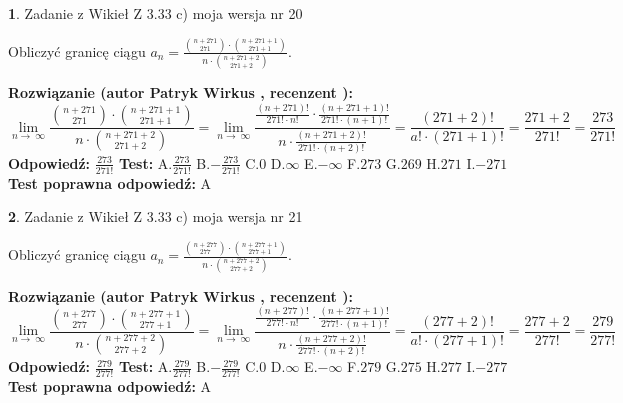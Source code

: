 \documentclass[12pt, a4paper]{article}
\theoremstyle{definition} %
\newtheorem{zad}{}
\newcommand{\zadStart}[1]{\begin{zad}#1\newline}
\newcommand{\zadStop}{\end{zad}}
\newcommand{\rozwStart}[2]{\noindent \textbf{Rozwiązanie (autor #1 , recenzent #2): }\newline}
\newcommand{\rozwStop}{\newline}
\newcommand{\odpStart}{\noindent \textbf{Odpowiedź:}\newline}
\newcommand{\odpStop}{\newline}
\newcommand{\testStart}{\noindent \textbf{Test:}\newline}
\newcommand{\testStop}{\newline}
\newcommand{\kluczStart}{\noindent \textbf{Test poprawna odpowiedź:}\newline}
\newcommand{\kluczStop}{\newline}
\begin{document}
\zadStart{Zadanie z Wikieł Z 3.33 c) moja wersja nr 20}

Obliczyć granicę ciągu $a_{n}=\frac{{n+271\choose271}\cdot{n+271+1\choose271+1}}{n\cdot{n+271+2\choose271+2}}$.
\zadStop
\rozwStart{Patryk Wirkus}{}
$$\lim\limits_{n\to\ \infty}\frac{{n+271\choose271}\cdot{n+271+1\choose271+1}}{n\cdot{n+271+2\choose271+2}} = \lim\limits_{n\to\ \infty}\frac{\frac{(n+271)!}{271! \cdot n!}\cdot \frac{(n+271+1)!}{271! \cdot (n+1)!}}{n\cdot \frac{(n+271+2)!}{271! \cdot (n+2)!}} = \frac{(271+2)!}{a!\cdot (271+1)!} = \frac{271+2}{271!} = \frac{273}{271!}$$
\rozwStop
\odpStart
$\frac{273}{271!}$
\odpStop
\testStart
A.$\frac{273}{271!}$ B.$-\frac{273}{271!}$ C.$0$ D.$\infty$ E.$-\infty$
F.$273$ G.$269$
H.$271$
I.$-271$
\testStop
\kluczStart
A
\kluczStop



\zadStart{Zadanie z Wikieł Z 3.33 c) moja wersja nr 21}

Obliczyć granicę ciągu $a_{n}=\frac{{n+277\choose277}\cdot{n+277+1\choose277+1}}{n\cdot{n+277+2\choose277+2}}$.
\zadStop
\rozwStart{Patryk Wirkus}{}
$$\lim\limits_{n\to\ \infty}\frac{{n+277\choose277}\cdot{n+277+1\choose277+1}}{n\cdot{n+277+2\choose277+2}} = \lim\limits_{n\to\ \infty}\frac{\frac{(n+277)!}{277! \cdot n!}\cdot \frac{(n+277+1)!}{277! \cdot (n+1)!}}{n\cdot \frac{(n+277+2)!}{277! \cdot (n+2)!}} = \frac{(277+2)!}{a!\cdot (277+1)!} = \frac{277+2}{277!} = \frac{279}{277!}$$
\rozwStop
\odpStart
$\frac{279}{277!}$
\odpStop
\testStart
A.$\frac{279}{277!}$ B.$-\frac{279}{277!}$ C.$0$ D.$\infty$ E.$-\infty$
F.$279$ G.$275$
H.$277$
I.$-277$
\testStop
\kluczStart
A
\kluczStop
\end{document}
